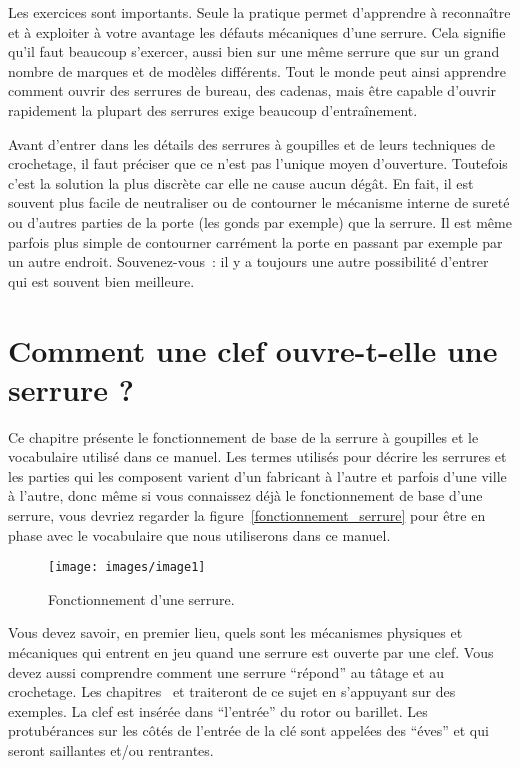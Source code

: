 \documentclass[a4paper,french,11pt,twoside]{report}
\begin{document}
Les exercices sont importants. Seule la pratique permet d'apprendre à reconnaître et à exploiter à votre avantage les défauts mécaniques d'une serrure. Cela signifie qu'il faut beaucoup s'exercer, aussi bien sur une même serrure que sur un grand nombre de marques et de modèles différents. Tout le monde peut ainsi apprendre comment ouvrir des serrures de bureau, des cadenas, mais être capable d'ouvrir rapidement la plupart des serrures exige beaucoup d'entraînement.

Avant d'entrer dans les détails des serrures à goupilles et de leurs techniques de crochetage, il faut préciser que ce n'est pas l'unique moyen d'ouverture. Toutefois c'est la solution la plus discrète car elle ne cause aucun dégât. En fait, il est souvent plus facile de neutraliser ou de contourner le mécanisme interne de sureté ou d'autres parties de la porte (les gonds par exemple) que la serrure. Il est même parfois plus simple de contourner carrément la porte en passant par exemple par un autre endroit. Souvenez-vous~: il y a toujours une autre possibilité d'entrer qui est souvent bien meilleure.

\chapter{\label{chap:comment_clef_serrure}Comment une clef ouvre-t-elle une serrure ?}
Ce chapitre présente le fonctionnement de base de la serrure à goupilles et le vocabulaire utilisé dans ce manuel. Les termes utilisés pour décrire les serrures et les parties qui les composent varient d'un fabricant à l'autre et parfois d'une ville à l'autre, donc même si vous connaissez déjà le fonctionnement de base d'une serrure, vous devriez regarder la figure~\vref{fonctionnement_serrure} pour être en phase avec le vocabulaire que nous utiliserons dans ce manuel.

\begin{figure}[ht]
  \texttt{[image: images/image1]}
  \caption{Fonctionnement d'une serrure.\label{fonctionnement_serrure}}
\end{figure}

Vous devez savoir, en premier lieu, quels sont les mécanismes physiques et mécaniques qui entrent en jeu quand une serrure est ouverte par une clef. Vous devez aussi comprendre comment une serrure \enquote{répond} au tâtage et au crochetage. Les chapitres~ et  traiteront de ce sujet en s'appuyant sur des exemples.
La clef est insérée dans \enquote{l'entrée} du rotor ou barillet. Les protubérances sur les côtés de l'entrée de la clé sont appelées des \enquote{éves} et qui seront saillantes et/ou rentrantes.
\end{document}
